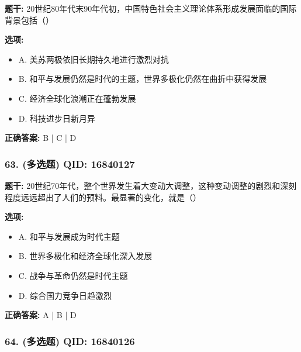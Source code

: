 \documentclass[12pt,UTF8]{ctexart}
\begin{document}
\textbf{题干:}
20世纪80年代末90年代初，中国特色社会主义理论体系形成发展面临的国际背景包括（）

\textbf{选项:}
\begin{itemize}[leftmargin=*]

  \item A. 美苏两极依旧长期持久地进行激烈对抗

  \item B. 和平与发展仍然是时代的主题，世界多极化仍然在曲折中获得发展

  \item C. 经济全球化浪潮正在蓬勃发展

  \item D. 科技进步日新月异

\end{itemize}

\textbf{正确答案:}
B | C | D

\vspace{0.3em}\hrulefill\vspace{0.7em}

\subsubsection*{63. (多选题) \small QID: 16840127}

\textbf{题干:}
20世纪70年代，整个世界发生着大变动大调整，这种变动调整的剧烈和深刻程度远远超出了人们的预料。最显著的变化，就是（）

\textbf{选项:}
\begin{itemize}[leftmargin=*]

  \item A. 和平与发展成为时代主题

  \item B. 世界多极化和经济全球化深入发展

  \item C. 战争与革命仍然是时代主题

  \item D. 综合国力竞争日趋激烈

\end{itemize}

\textbf{正确答案:}
A | B | D

\vspace{0.3em}\hrulefill\vspace{0.7em}

\subsubsection*{64. (多选题) \small QID: 16840126}
\end{document}
